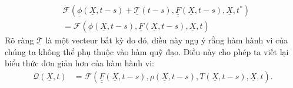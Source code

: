 \documentclass[../../../main.tex]{subfiles}
\begin{document}
		\begin{equation}
			\begin{aligned}
				&\mathcal{F}\left(\underline{\phi}\left(\underline{X},t-s\right)+\underline{\mathcal{T}}\left(t-s\right),\underline{\underline{F}}\left(\underline{X},t-s\right),\underline{X},t^*\right)\\
				&=\mathcal{F}\left(\underline{\phi}\left(\underline{X},t-s\right),\underline{\underline{F}}\left(\underline{X},t-s\right),\underline{X},t\right)
			\end{aligned}
		\end{equation}
	Rõ ràng $\underline{\mathcal{T}}$ là một vecteur bất kỳ do đó, điều này ngụ ý rằng hàm hành vi của chúng ta không thể phụ thuộc vào hàm quỹ đạo. Điều này cho phép ta viết lại biểu thức đơn giản hơn của hàm hành vi:
		\begin{align}
			\mathcal{Q}\left(\underline{X},t\right)&=\mathcal{F}\left(\underline{\underline{F}}\left(\underline{X},t-s\right),\rho\left(\underline{X},t-s\right),T\left(\underline{X},t-s\right),\underline{X},t\right).
		\end{align}
\end{document}
